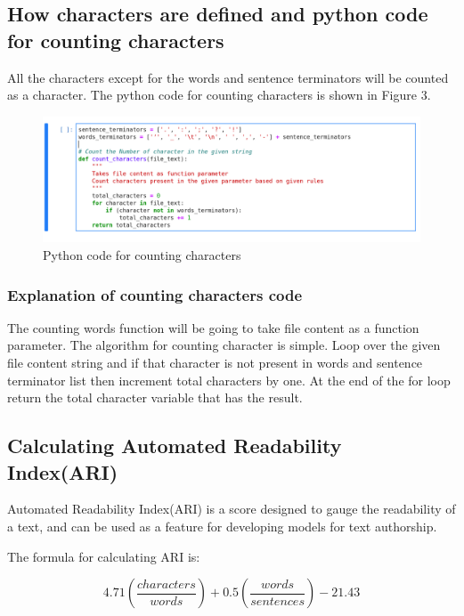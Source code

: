 \documentclass{article}
\begin{document}
\subsection{How characters are defined and python code for counting characters}

All the characters except for the words and sentence terminators will be counted as a character. The python code for counting characters is shown in Figure 3.

\begin{figure}
\centering
\includegraphics[scale=0.2]{screenshots/ai_a1-3.png}
\caption{\label{fig:python_code_counting_characters}Python code for counting characters}
\end{figure}

\subsubsection{Explanation of counting characters code}

The counting words function will be going to take file content as a function parameter. The algorithm for counting character is simple. Loop over the given file content string and if that character is not present in words and sentence terminator list then increment total characters by one. At the end of the for loop return the total character variable that has the result.





\subsection{Calculating Automated Readability Index(ARI)}
Automated Readability Index(ARI) is a score designed to gauge the readability of a text, and can be used as a feature for developing models for text authorship.
\

The formula for calculating ARI is:

\[ 
  4.71 \left( \frac{characters}{words} \right) + 0.5  \left( \frac{words}{sentences} \right) - 21.43
\]
\end{document}

